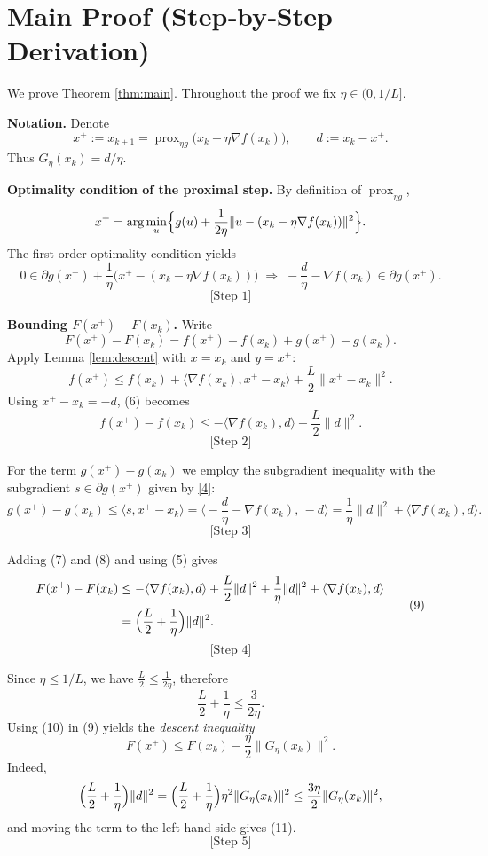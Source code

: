 \documentclass{article}
\newcommand{\prox}{\operatorname{prox}}
\newcommand{\grad}{\nabla}
\begin{document}
\section*{Main Proof (Step‑by‑Step Derivation)}
We prove Theorem \ref{thm:main}. Throughout the proof we fix $\eta\in(0,1/L]$.

\bigskip
\noindent\textbf{Notation.} Denote 
\[
x^{+}:=x_{k+1}=\prox_{\eta g}\bigl(x_{k}-\eta\grad f(x_{k})\bigr),\qquad
d:=x_{k}-x^{+}.
\]
Thus $G_{\eta}(x_{k})=d/\eta$.

\bigskip
\noindent\textbf{Optimality condition of the proximal step.} By definition of $\prox_{\eta g}$,
\[
x^{+}=\arg\min_{u}\Bigl\{ g(u)+\frac{1}{2\eta}\|u-(x_{k}-\eta\grad f(x_{k}))\|^{2}\Bigr\}.
\]
The first‑order optimality condition yields
\[
0\in\partial g(x^{+})+\frac{1}{\eta}\bigl(x^{+}-(x_{k}-\eta\grad f(x_{k}))\bigr)
\;\Longrightarrow\;
-\frac{d}{\eta}-\grad f(x_{k})\in\partial g(x^{+}).
\tag{4}
\]
\[
\text{[Step 1]} 
\]

\noindent\textbf{Bounding $F(x^{+})-F(x_{k})$.} Write
\[
F(x^{+})-F(x_{k})
= f(x^{+})-f(x_{k})+g(x^{+})-g(x_{k}).
\tag{5}
\]
Apply Lemma \ref{lem:descent} with $x=x_{k}$ and $y=x^{+}$:
\[
f(x^{+})\le f(x_{k})+\langle\grad f(x_{k}),x^{+}-x_{k}\rangle+\frac{L}{2}\|x^{+}-x_{k}\|^{2}.
\tag{6}
\]
Using $x^{+}-x_{k}=-d$, (6) becomes
\[
f(x^{+})-f(x_{k})\le -\langle\grad f(x_{k}),d\rangle+\frac{L}{2}\|d\|^{2}.
\tag{7}
\]
\[
\text{[Step 2]}
\]

\noindent For the term $g(x^{+})-g(x_{k})$ we employ the subgradient inequality with the subgradient $s\in\partial g(x^{+})$ given by \eqref{4}:
\[
g(x^{+})-g(x_{k})\le \langle s, x^{+}-x_{k}\rangle
= \Big\langle -\frac{d}{\eta}-\grad f(x_{k}),\, -d\Big\rangle
= \frac{1}{\eta}\|d\|^{2}+\langle\grad f(x_{k}),d\rangle .
\tag{8}
\]
\[
\text{[Step 3]}
\]

\noindent Adding (7) and (8) and using (5) gives
\[
\begin{aligned}
F(x^{+})-F(x_{k})
&\le -\langle\grad f(x_{k}),d\rangle+\frac{L}{2}\|d\|^{2}
   +\frac{1}{\eta}\|d\|^{2}+\langle\grad f(x_{k}),d\rangle  \\
&= \Bigl(\frac{L}{2}+\frac{1}{\eta}\Bigr)\|d\|^{2}.
\end{aligned}
\tag{9}
\]
\[
\text{[Step 4]}
\]

\noindent Since $\eta\le 1/L$, we have $\frac{L}{2}\le \frac{1}{2\eta}$, therefore
\[
\frac{L}{2}+\frac{1}{\eta}\le \frac{3}{2\eta}.
\tag{10}
\]
Using (10) in (9) yields the \emph{descent inequality}
\[
F(x^{+})\le F(x_{k})-\frac{\eta}{2}\|G_{\eta}(x_{k})\|^{2}.
\tag{11}
\]
Indeed,
\[
\Bigl(\frac{L}{2}+\frac{1}{\eta}\Bigr)\|d\|^{2}
= \Bigl(\frac{L}{2}+\frac{1}{\eta}\Bigr)\eta^{2}\|G_{\eta}(x_{k})\|^{2}
\le \frac{3\eta}{2}\|G_{\eta}(x_{k})\|^{2},
\]
and moving the term to the left‑hand side gives (11).  
\[
\text{[Step 5]}
\]
\end{document}
